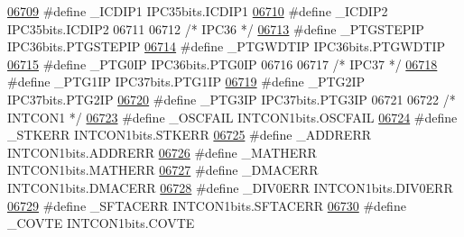 \begin{DoxyCode}
\hypertarget{a00009_source_l06709}{}\hyperlink{a00009_a86b7a2e296397ff1c3bfab86455ede05}{06709} \textcolor{preprocessor}{#define \_ICDIP1 IPC35bits.ICDIP1}
\hypertarget{a00009_source_l06710}{}\hyperlink{a00009_a821e82aacd16a37acf69d22c5ff3630b}{06710} \textcolor{preprocessor}{#define \_ICDIP2 IPC35bits.ICDIP2}
06711 
06712 \textcolor{comment}{/* IPC36 */}
\hypertarget{a00009_source_l06713}{}\hyperlink{a00009_aa8a15abb24650e0c04e57bf1b51075d5}{06713} \textcolor{preprocessor}{#define \_PTGSTEPIP IPC36bits.PTGSTEPIP}
\hypertarget{a00009_source_l06714}{}\hyperlink{a00009_aa70a70554fd1f0cf90b94da6aa97de47}{06714} \textcolor{preprocessor}{#define \_PTGWDTIP IPC36bits.PTGWDTIP}
\hypertarget{a00009_source_l06715}{}\hyperlink{a00009_ae627288eb4b83995faf9c03a15230176}{06715} \textcolor{preprocessor}{#define \_PTG0IP IPC36bits.PTG0IP}
06716 
06717 \textcolor{comment}{/* IPC37 */}
\hypertarget{a00009_source_l06718}{}\hyperlink{a00009_ad3fa5a496a50d47cad23974f3011e527}{06718} \textcolor{preprocessor}{#define \_PTG1IP IPC37bits.PTG1IP}
\hypertarget{a00009_source_l06719}{}\hyperlink{a00009_a29cb8fbd047d4a4ea164e9e98c8959d9}{06719} \textcolor{preprocessor}{#define \_PTG2IP IPC37bits.PTG2IP}
\hypertarget{a00009_source_l06720}{}\hyperlink{a00009_a6b25297c42b156f294317853b2cad562}{06720} \textcolor{preprocessor}{#define \_PTG3IP IPC37bits.PTG3IP}
06721 
06722 \textcolor{comment}{/* INTCON1 */}
\hypertarget{a00009_source_l06723}{}\hyperlink{a00009_ab93b5e4053dc93244f73243b2332ba4b}{06723} \textcolor{preprocessor}{#define \_OSCFAIL INTCON1bits.OSCFAIL}
\hypertarget{a00009_source_l06724}{}\hyperlink{a00009_aa13b1fc6a2a6dd7ca350f0cea5d7e6c8}{06724} \textcolor{preprocessor}{#define \_STKERR INTCON1bits.STKERR}
\hypertarget{a00009_source_l06725}{}\hyperlink{a00009_abb518812d534c811c6e63d68c2ed47d2}{06725} \textcolor{preprocessor}{#define \_ADDRERR INTCON1bits.ADDRERR}
\hypertarget{a00009_source_l06726}{}\hyperlink{a00009_a9e1c315da4f5e9dfea421da45fe2867d}{06726} \textcolor{preprocessor}{#define \_MATHERR INTCON1bits.MATHERR}
\hypertarget{a00009_source_l06727}{}\hyperlink{a00009_ac2069c847121e91f88c01b720d3506e2}{06727} \textcolor{preprocessor}{#define \_DMACERR INTCON1bits.DMACERR}
\hypertarget{a00009_source_l06728}{}\hyperlink{a00009_ab21fadd3446553d0bd7385eb651a1d40}{06728} \textcolor{preprocessor}{#define \_DIV0ERR INTCON1bits.DIV0ERR}
\hypertarget{a00009_source_l06729}{}\hyperlink{a00009_a6cfd50a286b0d7d7586bfe451c974858}{06729} \textcolor{preprocessor}{#define \_SFTACERR INTCON1bits.SFTACERR}
\hypertarget{a00009_source_l06730}{}\hyperlink{a00009_aa801fd12da541242cf281ec999cff0f0}{06730} \textcolor{preprocessor}{#define \_COVTE INTCON1bits.COVTE}

\end{DoxyCode}
